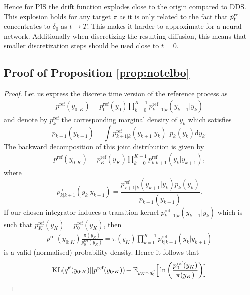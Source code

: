 \documentclass{article} %
\begin{document}
Hence for PIS the drift function explodes close to the origin compared to DDS. This explosion holds for any target $\pi$ as it is only related to the fact that $p^{\textup{ref}}_{t}$ concentrates to $\delta_0$ as $t\rightarrow T$. This makes it harder to approximate for a neural network. Additionally when discretizing the resulting diffusion, this means that smaller discretization steps should be used close to $t=0$.


\subsection{Proof of Proposition \ref{prop:notelbo}}

\begin{proof}
Let us express the discrete time version of the reference process as
\begin{align}
    p^{\mathrm{ref}} (y_{0:K}) =   p_0^{\mathrm{ref}}(y_0) \prod_{k=0}^{K-1}  p^{\mathrm{ref}}_{k +1| k} (y_{k+1}| y_k)
\end{align}
and denote by $p^{\mathrm{ref}}_k$ the corresponding marginal density of $y_k$ which satisfies 
\begin{equation}
    p_{k+1}(y_{k+1}) = \int  p^{\mathrm{ref}}_{k +1| k} (y_{k+1}| y_{k})~~ p_{k}(y_k) \mathrm{d}y_k.
\end{equation}
The backward decomposition of this joint distribution is given by
\begin{align}
    p^{\mathrm{ref}} (y_{0:K}) =p_K^{\mathrm{ref}}(y_K)\prod_{k=0}^{K-1}  p^{\mathrm{ref}}_{k| k+1} (y_{k}| y_{k+1}),
\end{align}
where 
\begin{equation}
     p^{\mathrm{ref}}_{k| k+1} (y_{k}| y_{k+1})=\frac{p^{\mathrm{ref}}_{k +1| k} (y_{k+1}| y_k) p_{k}(y_k) }{ p_{k+1}(y_{k+1})}.
\end{equation}
If our chosen integrator induces a transition kernel $p^{\mathrm{ref}}_{k +1| k} (y_{k+1}| y_k)$ which is such that $p^{\mathrm{ref}}_K(y_K) = p_0^{\mathrm{ref}}(y_K)$, then 
\begin{align}
     p^{\mathrm{ref}} (y_{0:K})  \frac{\pi(y_K)}{p_0^{\mathrm{ref}}(y_K)} =  \pi(y_K) \prod_{k=0}^{K-1}  p^{\mathrm{ref}}_{k| k+1} (y_{k}| y_{k+1})
\end{align}
is a valid (normalised) probability density. Hence it follows that 
\begin{align}
    &\KL(q^\theta(y_{0:K})||{p}^{\textup{ref}}(y_{0:K}))+\mathbb{E}_{y_K \sim q^{\theta}_0}\Bigr[\ln \left(\frac{p^{\textup{ref}}_0(y_K)}{\pi(y_K)}\right)\Bigr]  \\

\end{align}
\end{proof}
\end{document}
